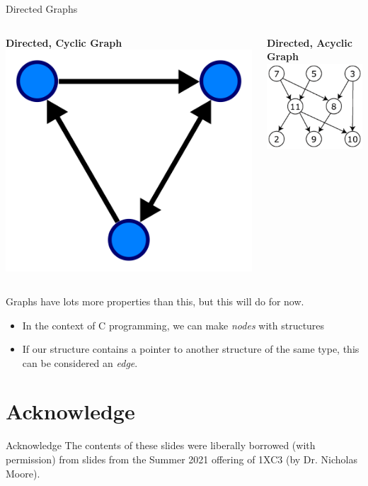 \documentclass[11pt]{beamer}
\begin{document}
\begin{frame}{Directed Graphs}
\begin{columns}
\begin{column}{0.5\textwidth}
\center
\textbf{Directed, Cyclic Graph}
\includegraphics[scale=0.1]{directed.png}
\end{column}
\begin{column}{0.5\textwidth}
\center
\textbf{Directed, Acyclic Graph}
\includegraphics[scale=0.4]{directedAcyclic.png}
\end{column}
\end{columns}
Graphs have lots more properties than this, but this will do for now.
\begin{itemize}
\item In the context of C programming, we can make \emph{nodes} with structures
\item If our structure contains a pointer to another structure of the same type, this can be considered an \emph{edge}.  
\end{itemize}
\end{frame}

\section[Acknowledge]{Acknowledge}
\begin{frame}{Acknowledge}
\center
\vspace{8em}
The contents of these slides were liberally borrowed (with permission) from slides from the Summer 2021 offering of 1XC3 (by Dr. Nicholas Moore).  
\end{frame}
\end{document}

